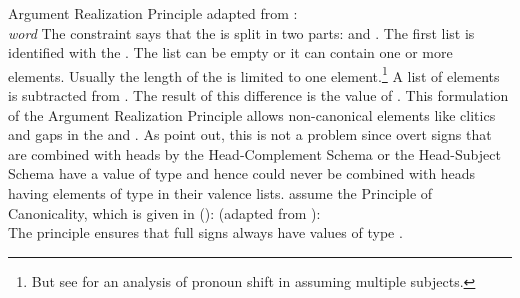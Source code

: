 \documentclass[output=paper
 	        ,biblatex
                ,babelshorthands
                ,newtxmath
                ,draftmode
                ,colorlinks, citecolor=brown
]{langscibook}
\begin{document}
%
\ea\label{ARP} 
Argument Realization Principle adapted from :\\
\emph{word} \impl
{}
\z
The constraint says that the \argstl is split in two parts:  and . The first list is
identified with the \subjl. The list can be empty or it can contain one or more elements. Usually
the length of the \subjl is limited to one element.\footnote{
But see  for an analysis of pronoun shift in  assuming multiple subjects.
} A list of  elements is
subtracted from . The result of this difference is the value of \comps. This formulation of
the Argument Realization Principle allows non-canonical elements like clitics and gaps in the \subj
and \compsl. As \citet[]{GSag2000a-u} point out, this is not a problem since overt signs that are
combined with heads by the Head-Complement Schema or the Head-Subject Schema have a \synsem value of
type  and hence could never be combined with heads having elements of
type  in their valence lists. \citet[]{GSag2000a-u} assume the Principle
of Canonicality, which is given in ():
\ea
{} (adapted from \citealt[]{GSag2000a-u}):\\
 \impl {}
\z
The principle ensures that full signs always have \synsem values of type .
\end{document}
